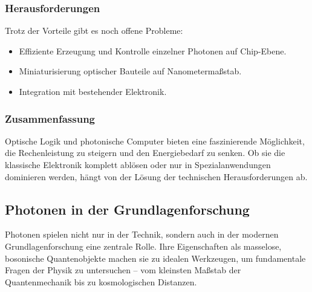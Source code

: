 \subsubsection{Herausforderungen}

Trotz der Vorteile gibt es noch offene Probleme:
\begin{itemize}
	\item Effiziente Erzeugung und Kontrolle einzelner Photonen auf Chip-Ebene.
	\item Miniaturisierung optischer Bauteile auf Nanometermaßstab.
	\item Integration mit bestehender Elektronik.
\end{itemize}

\subsubsection{Zusammenfassung}

Optische Logik und photonische Computer bieten eine faszinierende Möglichkeit, die Rechenleistung zu steigern und den Energiebedarf zu senken. Ob sie die klassische Elektronik komplett ablösen oder nur in Spezialanwendungen dominieren werden, hängt von der Lösung der technischen Herausforderungen ab.

\subsection{Photonen in der Grundlagenforschung}

Photonen spielen nicht nur in der Technik, sondern auch in der modernen Grundlagenforschung eine zentrale Rolle. 
Ihre Eigenschaften als masselose, bosonische Quantenobjekte machen sie zu idealen Werkzeugen, um fundamentale Fragen der Physik zu untersuchen – vom kleinsten Maßstab der Quantenmechanik bis zu kosmologischen Distanzen.


